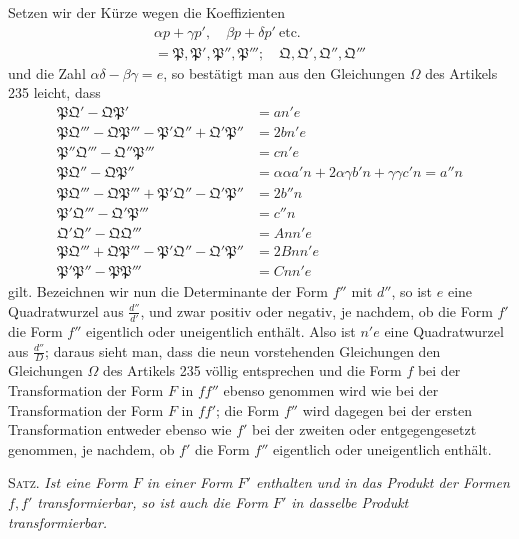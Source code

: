 Setzen wir der Kürze wegen die Koeffizienten
\[
\begin{gathered}\alpha p+\gamma p',\quad\beta p+\delta p'\ \text{etc.}\\=\mathfrak{P},\mathfrak{P}',\mathfrak{P}'',\mathfrak{P}''';\quad\mathfrak{Q},\mathfrak{Q}',\mathfrak{Q}'',\mathfrak{Q}'''\end{gathered}
\]
und die Zahl $\alpha\delta-\beta\gamma=e$, so bestätigt man aus den Gleichungen $\Omega$ des Artikels 235 leicht, dass
\[
\begin{aligned}
\mathfrak{P}\mathfrak{Q}'-\mathfrak{Q}\mathfrak{P}'&=an'e\\
\mathfrak{P}\mathfrak{Q}'''-\mathfrak{Q}\mathfrak{P}'''-\mathfrak{P}'\mathfrak{Q}''+\mathfrak{Q}'\mathfrak{P}''&=2bn'e\\
\mathfrak{P}''\mathfrak{Q}'''-\mathfrak{Q}''\mathfrak{P}'''&=cn'e\\
\mathfrak{P}\mathfrak{Q}''-\mathfrak{Q}\mathfrak{P}''&=\alpha\alpha a'n+2\alpha\gamma b'n+\gamma\gamma c'n=a''n\\
\mathfrak{P}\mathfrak{Q}'''-\mathfrak{Q}\mathfrak{P}'''+\mathfrak{P}'\mathfrak{Q}''-\mathfrak{Q}'\mathfrak{P}''&=2b''n\\
\mathfrak{P}'\mathfrak{Q}'''-\mathfrak{Q}'\mathfrak{P}'''&=c''n\\
\mathfrak{Q}'\mathfrak{Q}''-\mathfrak{Q}\mathfrak{Q}'''&=Ann'e\\
\mathfrak{P}\mathfrak{Q}'''+\mathfrak{Q}\mathfrak{P}'''-\mathfrak{P}'\mathfrak{Q}''-\mathfrak{Q}'\mathfrak{P}''&=2Bnn'e\\
\mathfrak{P}'\mathfrak{P}''-\mathfrak{P}\mathfrak{P}'''&=Cnn'e
\end{aligned}
\]
gilt. Bezeichnen wir nun die Determinante der Form $f''$ mit $d''$, so ist $e$ eine Quadratwurzel aus $\frac{d''}{d'}$, und zwar positiv oder negativ, je nachdem, ob die Form $f'$ die Form $f''$ eigentlich oder uneigentlich enthält. Also ist $n'e$ eine Quadratwurzel aus $\frac{d''}{D}$; daraus sieht man, dass die neun vorstehenden Gleichungen den Gleichungen $\Omega$ des Artikels 235 völlig entsprechen und die Form $f$ bei der Transformation der Form $F$ in $ff''$ ebenso genommen wird wie bei der Transformation der Form $F$ in $ff'$; die Form $f''$ wird dagegen bei der ersten Transformation entweder ebenso wie $f'$ bei der zweiten oder entgegengesetzt genommen, je nachdem, ob $f'$ die Form $f''$ eigentlich oder uneigentlich enthält.

\textsc{Satz.} \textit{Ist eine Form $F$ in einer Form $F'$ enthalten und in das Produkt der Formen $f,f'$ transformierbar, so ist auch die Form $F'$ in dasselbe Produkt transformierbar.}

